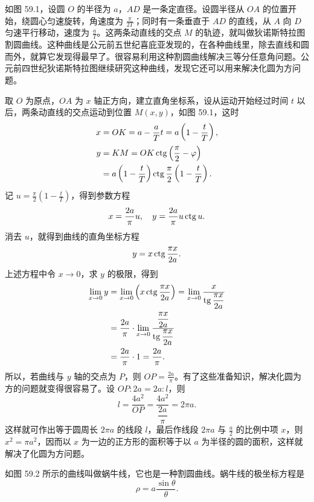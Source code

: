 \hfill
\begin{minipage}[c]{0.55\textwidth}
\hspace*{2em}如图 59.1，设圆 $O$ 的半径为 $a$，$AD$ 是一条定直径。设圆半径从 $OA$ 的位置开始，绕圆心匀速旋转，角速度为 $\frac{\pi}{2T}$；同时有一条垂直于 $AD$ 的直线，从 $A$ 向 $D$ 匀速平行移动，速度为 $\frac{a}{T}$。这两条动直线的交点 $M$ 的轨迹，就叫做狄诺斯特拉图割圆曲线。这种曲线是公元前五世纪喜庇亚发现的，在各种曲线里，除去直线和圆而外，就算它发现得最早了。很容易利用这种割圆曲线解决三等分任意角问题。公元前四世纪狄诺斯特拉图继续研究这种曲线，发现它还可以用来解决化圆为方问题。
\end{minipage}

取 $O$ 为原点，$OA$ 为 $x$ 轴正方向，建立直角坐标系，设从运动开始经过时间 $t$ 以后，两条动直线的交点运动到位置 $M(x,y)$，如图 59.1，这时
\begin{align*}
  x &= OK = a - \frac{a}{T}t = a\left(1 - \frac{t}{T}\right), \\
  y &= KM = OK\operatorname{ctg}\left(\frac{\pi}{2} - \varphi\right) \\
    &= a\left(1 - \frac{t}{T}\right)\operatorname{ctg}\frac{\pi}{2}\left(1 - \frac{t}{T}\right).
\end{align*}
记 $u = \frac{\pi}{2}\left(1 - \frac{t}{T}\right)$，得到参数方程
\[
  x = \frac{2a}{\pi}u,\quad y = \frac{2a}{\pi}u\operatorname{ctg} u.
\]
消去 $u$，就得到曲线的直角坐标方程
\[
  y = x\operatorname{ctg}\frac{\pi x}{2a}.
\]
上述方程中令 $x \to 0$，求 $y$ 的极限，得到
\begin{align*}
  \lim_{x \to 0} y &= \lim_{x \to 0}\left(x\operatorname{ctg}\frac{\pi x}{2a}\right) = \lim_{x \to 0}\frac{x}{\operatorname{tg}\dfrac{\pi x}{2a}} \\
                  &= \frac{2a}{\pi}\cdot\lim_{x \to 0}\frac{\dfrac{\pi x}{2a}}{\operatorname{tg}\dfrac{\pi x}{2a}} \\
                  &= \frac{2a}{\pi}\cdot 1 = \frac{2a}{\pi}.
\end{align*}
所以，若曲线与 $y$ 轴的交点为 $P$，则 $OP = \frac{2a}{\pi}$。有了这些准备知识，解决化圆为方的问题就变得很容易了。设 $OP : 2a = 2a : l$，则
\[
  l = \frac{4a^2}{OP} = \frac{4a^2}{\dfrac{2a}{\pi}} = 2\pi a.
\]
这样就可作出等于圆周长 $2\pi a$ 的线段 $l$，最后作线段 $2\pi a$ 与 $\frac{a}{2}$ 的比例中项 $x$，则 $x^2 = \pi a^2$，因而以 $x$ 为一边的正方形的面积等于以 $a$ 为半径的圆的面积，这样就解决了化圆为方问题。

如图 59.2 所示的曲线叫做蜗牛线，它也是一种割圆曲线。蜗牛线的极坐标方程是
\[
  \rho = a\frac{\sin\theta}{\theta}.
\]

